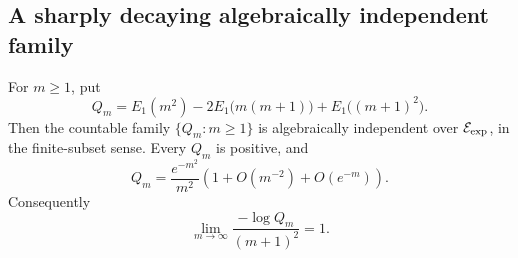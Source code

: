\subsection{A sharply decaying algebraically independent family}

\begin{theorem}
\label{thm:quadratic-balanced-E1}
For \(m\geq1\), put
\begin{equation}\label{eq:quadratic-balanced-E1-definition}
 Q_m=E_1(m^2)-2E_1\bigl(m(m+1)\bigr)+E_1\bigl((m+1)^2\bigr).
\end{equation}
Then the countable family \(\{Q_m:m\geq1\}\) is algebraically independent
over \(\mathcal E_{\mathrm{exp}}\), in the finite-subset sense.  Every \(Q_m\) is positive, and
\begin{equation}\label{eq:quadratic-balanced-E1-asymptotic}
 Q_m=\frac{e^{-m^2}}{m^2}
 \left(1+O(m^{-2})+O(e^{-m})\right).
\end{equation}
Consequently
\begin{equation}\label{eq:quadratic-balanced-E1-saturation}
 \boxed{
 \lim_{m\to\infty}
 \frac{-\log Q_m}{(m+1)^2}=1.}
\end{equation}
\end{theorem}

